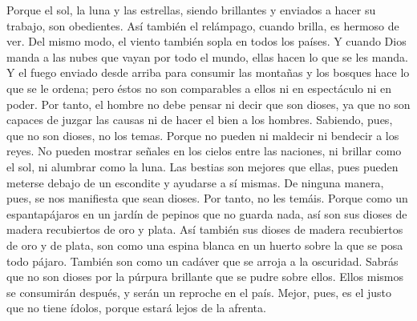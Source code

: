  Porque el sol, la luna y las estrellas, siendo
brillantes y enviados a hacer su trabajo, son obedientes.
 Así también el relámpago, cuando brilla, es hermoso de
ver. Del mismo modo, el viento también sopla en todos los países.
 Y cuando Dios manda a las nubes que vayan por todo el
mundo, ellas hacen lo que se les manda.  Y el fuego
enviado desde arriba para consumir las montañas y los bosques hace lo
que se le ordena; pero éstos no son comparables a ellos ni en
espectáculo ni en poder.  Por tanto, el hombre no debe
pensar ni decir que son dioses, ya que no son capaces de juzgar las
causas ni de hacer el bien a los hombres.  Sabiendo,
pues, que no son dioses, no los temas.  Porque no pueden
ni maldecir ni bendecir a los reyes.  No pueden mostrar
señales en los cielos entre las naciones, ni brillar como el sol, ni
alumbrar como la luna.  Las bestias son mejores que
ellas, pues pueden meterse debajo de un escondite y ayudarse a sí
mismas.  De ninguna manera, pues, se nos manifiesta que
sean dioses. Por tanto, no les temáis.  Porque como un
espantapájaros en un jardín de pepinos que no guarda nada, así son sus
dioses de madera recubiertos de oro y plata.  Así también
sus dioses de madera recubiertos de oro y de plata, son como una espina
blanca en un huerto sobre la que se posa todo pájaro. También son como
un cadáver que se arroja a la oscuridad.  Sabrás que no
son dioses por la púrpura brillante que se pudre sobre ellos. Ellos
mismos se consumirán después, y serán un reproche en el país.
 Mejor, pues, es el justo que no tiene ídolos, porque
estará lejos de la afrenta.
